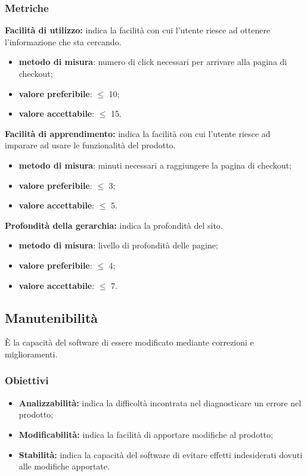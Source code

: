 \subsubsection{Metriche}
\textbf{Facilità di utilizzo:} indica la facilità con cui l'utente riesce ad ottenere l'informazione che sta cercando.
\begin{itemize}
    \item \textbf{metodo di misura}: numero di click necessari per arrivare alla pagina di checkout;
    \item \textbf{valore preferibile}: $\leq$ 10;
    \item \textbf{valore accettabile}: $\leq$ 15.
\end{itemize}
\textbf{Facilità di apprendimento:} indica la facilità con cui l'utente riesce ad imparare ad usare le funzionalità del prodotto.
\begin{itemize}
    \item \textbf{metodo di misura}: minuti necessari a raggiungere la pagina di checkout;
    \item \textbf{valore preferibile}: $\leq$ 3;
    \item \textbf{valore accettabile}: $\leq$ 5.
\end{itemize}
\textbf{Profondità della gerarchia:} indica la profondità del sito.
\begin{itemize}
    \item \textbf{metodo di misura}: livello di profondità delle pagine;
    \item \textbf{valore preferibile}: $\leq$ 4;
    \item \textbf{valore accettabile}: $\leq$ 7.
\end{itemize}
\subsection{Manutenibilità}
È la capacità del software di essere modificato mediante correzioni e miglioramenti.
\subsubsection{Obiettivi}
\begin{itemize}
    \item \textbf{Analizzabilità:} indica la difficoltà incontrata nel diagnosticare un errore nel prodotto;
    \item \textbf{Modificabilità:} indica la facilità di apportare modifiche al prodotto;
    \item \textbf{Stabilità:} indica la capacità del software di evitare effetti indesiderati dovuti alle modifiche apportate.
\end{itemize}
